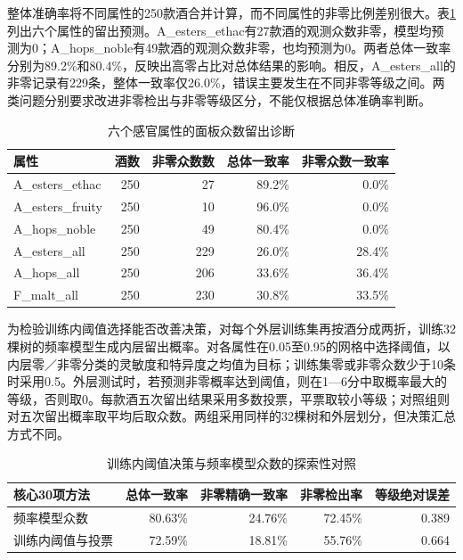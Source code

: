 \documentclass{mathorcup-journal}
\begin{document}
整体准确率将不同属性的250款酒合并计算，而不同属性的非零比例差别很大。表\ref{tab:targetdiag}列出六个属性的留出预测。A\_esters\_ethac有27款酒的观测众数非零，模型均预测为0；A\_hops\_noble有49款酒的观测众数非零，也均预测为0。两者总体一致率分别为89.2\%和80.4\%，反映出高零占比对总体结果的影响。相反，A\_esters\_all的非零记录有229条，整体一致率仅26.0\%，错误主要发生在不同非零等级之间。两类问题分别要求改进非零检出与非零等级区分，不能仅根据总体准确率判断。

\begin{table}[t]
\centering\small
\caption{六个感官属性的面板众数留出诊断}\label{tab:targetdiag}
\begin{tabular}{lrrrr}
\toprule
属性 & 酒数 & 非零众数数 & 总体一致率 & 非零众数一致率\\
\midrule
A\_esters\_ethac & 250 & 27 & 89.2\% & 0.0\%\\
A\_esters\_fruity & 250 & 10 & 96.0\% & 0.0\%\\
A\_hops\_noble & 250 & 49 & 80.4\% & 0.0\%\\
A\_esters\_all & 250 & 229 & 26.0\% & 28.4\%\\
A\_hops\_all & 250 & 206 & 33.6\% & 36.4\%\\
F\_malt\_all & 250 & 230 & 30.8\% & 33.5\%\\
\bottomrule
\end{tabular}
\end{table}

为检验训练内阈值选择能否改善决策，对每个外层训练集再按酒分成两折，训练32棵树的频率模型生成内层留出概率。对各属性在0.05至0.95的网格中选择阈值，以内层零／非零分类的灵敏度和特异度之均值为目标；训练集零或非零众数少于10条时采用0.5。外层测试时，若预测非零概率达到阈值，则在1—6分中取概率最大的等级，否则取0。每款酒五次留出结果采用多数投票，平票取较小等级；对照组则对五次留出概率取平均后取众数。两组采用同样的32棵树和外层划分，但决策汇总方式不同。

\begin{table}[t]
\centering\small
\caption{训练内阈值决策与频率模型众数的探索性对照}\label{tab:threshold}
\begin{tabular}{lrrrr}
\toprule
核心30项方法 & 总体一致率 & 非零精确一致率 & 非零检出率 & 等级绝对误差\\
\midrule
频率模型众数 & 80.63\% & 24.76\% & 72.45\% & 0.389\\
训练内阈值与投票 & 72.59\% & 18.81\% & 55.76\% & 0.664\\
\bottomrule
\end{tabular}
\end{table}
\end{document}
